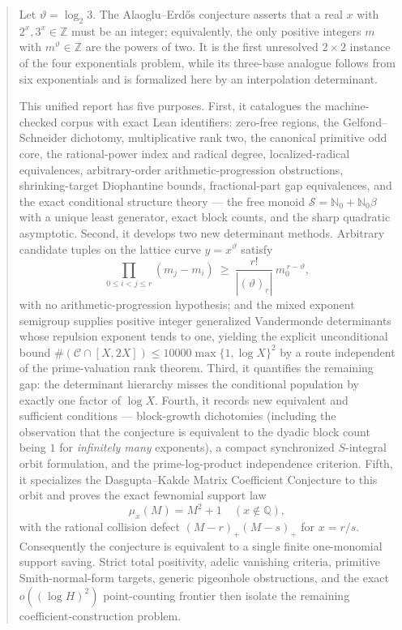 \documentclass[11pt,oneside]{article}
\theoremstyle{definition}
\theoremstyle{remark}
\newcommand{\Nzero}{\mathbb N_0}
\newcommand{\Z}{\mathbb Z}
\newcommand{\Q}{\mathbb Q}
\newcommand{\thetaq}{\vartheta}
\newcommand{\Sol}{\mathcal S}
\newcommand{\Cand}{\mathcal C}
\newcommand{\fall}[2]{\left(#1\right)_{\!\underline{#2}}}
\begin{document}

\begin{abstract}
Let $\thetaq=\log_2 3$.  The Alaoglu--Erd\H{o}s conjecture asserts that a real $x$ with
$2^x,3^x\in\Z$ must be an integer; equivalently, the only positive integers $m$ with
$m^{\thetaq}\in\Z$ are the powers of two.  It is the first unresolved $2\times2$ instance of
the four exponentials problem, while its three-base analogue follows from six exponentials and
is formalized here by an interpolation determinant.

This unified report has five purposes.  First, it catalogues the machine-checked corpus with
exact Lean identifiers: zero-free regions, the Gelfond--Schneider dichotomy, multiplicative
rank two, the canonical primitive odd core, the rational-power index and radical degree,
localized-radical equivalences, arbitrary-order arithmetic-progression obstructions,
shrinking-target Diophantine bounds, fractional-part gap equivalences, and the exact
conditional structure theory --- the free monoid $\Sol=\Nzero+\Nzero\beta$ with a unique least
generator, exact block counts, and the sharp quadratic asymptotic.  Second, it develops two new
determinant methods.  Arbitrary candidate tuples on the lattice curve $y=x^{\thetaq}$ satisfy
\[
 \prod_{0\le i<j\le r}(m_j-m_i)\ \ge\ \frac{r!}{|\fall{\thetaq}{r}|}\,m_0^{\,r-\thetaq},
\]
with no arithmetic-progression hypothesis; and the mixed exponent semigroup supplies positive
integer generalized Vandermonde determinants whose repulsion exponent tends to one, yielding
the explicit unconditional bound $\#(\Cand\cap[X,2X])\le10000\max\{1,\log X\}^2$ by a route
independent of the prime-valuation rank theorem.  Third, it quantifies the remaining gap: the
determinant hierarchy misses the conditional population by exactly one factor of $\log X$.
Fourth, it records new equivalent and sufficient conditions --- block-growth dichotomies
(including the observation that the conjecture is equivalent to the dyadic block count being
$1$ for \emph{infinitely many} exponents), a compact synchronized $S$-integral orbit
formulation, and the prime-log-product independence criterion.  Fifth, it specializes the
Dasgupta--Kakde Matrix Coefficient Conjecture to this orbit and proves the exact fewnomial
support law
\[
  \mu_x(M)=M^2+1\quad(x\notin\Q),
\]
with the rational collision defect
$(M-r)_+(M-s)_+$ for $x=r/s$.  Consequently the conjecture is equivalent to a single finite
one-monomial support saving.  Strict total positivity, adelic vanishing criteria, primitive
Smith-normal-form targets, generic pigeonhole obstructions, and the exact
$o((\log H)^2)$ point-counting frontier then isolate the remaining coefficient-construction
problem.
\end{abstract}
\end{document}
